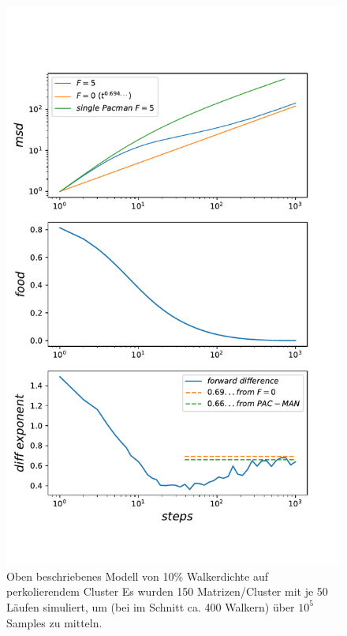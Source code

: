 \documentclass[a4paper, 12pt]{report}
\begin{document}
\begin{figure}[H]
	\centering
	\includegraphics[scale=0.75]{10percent_on_pc_new_version.pdf}
	\caption{Oben beschriebenes Modell von 10\% Walkerdichte auf perkolierendem Cluster \break
	Es wurden 150 Matrizen/Cluster mit je 50 Läufen simuliert, um (bei im Schnitt ca. 400 Walkern) über $10^5$ Samples zu mitteln.  }
\end{figure}

\clearpage
\end{document}
